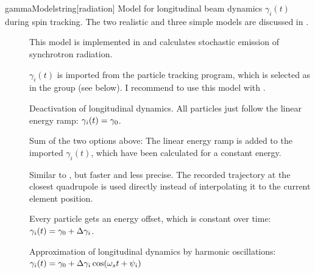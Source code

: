 \documentclass[a4paper]{scrartcl}
\begin{document}
\begin{configdoc}{gammaModel}{string}{}[radiation]
  Model for longitudinal beam dynamics $\gamma_i(t)$ during spin tracking. The two
  realistic and three simple models are discussed in \cite[chapter~4]{dr}.
  \begin{description}
  \item[] This model is implemented in \polem and calculates
    stochastic emission of synchrotron radiation.
  \item[] $\gamma_i(t)$ is imported from the particle tracking program,
    which is selected as  in the group  (see below).
    I recommend to use this model with \ele.
  \item[] Deactivation of longitudinal dynamics. All particles just
    follow the linear energy ramp: $\gamma_i(t) = \gamma_0$.
  \item[] Sum of the two options above: The linear energy ramp
    is added to the imported $\gamma_i(t)$, which have been calculated for a constant
    energy.
  \item[] Similar to , but faster
    and less precise. The recorded trajectory at the closest quadrupole is used directly
    instead of interpolating it to the current element position.
  \item[] Every particle gets an energy offset, which is constant over
    time: $\gamma_i(t) = \gamma_0 + \Delta\gamma_i$.
  \item[] Approximation of longitudinal dynamics by harmonic
    oscillations:\\$\gamma_i(t) = \gamma_0 + \Delta\gamma_i \cos(\omega_s t + \psi_i)$
  \end{description}
\end{configdoc}
\end{document}
